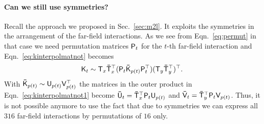 \paragraph{Can we still use symmetries?} Recall the approach we proposed in
Sec.~\ref{sec:m2l}. It exploits the symmetries in the arrangement of the
far-field interactions. As we see from Eqn.~\eqref{eq:permut} in that case we
need permutation matrices $\mathsf{P}_t$ for the $t$-th far-field interaction and
Eqn.~\eqref{eq:kinterpolmatnot} becomes
\begin{equation}
  \label{eq:symsplit}
  \mathsf{K}_t \sim \mathsf{T}_x \mathsf{\bar T}_x^\top (\mathsf{P}_t \mathsf{\bar K}_{p(t)}
  \mathsf{P}_t^\top) (\mathsf{T}_y \mathsf{\bar T}_y^\top)^\top.
\end{equation}
With $\mathsf{\bar K}_{p(t)} \sim \mathsf{U}_{p(t)} \mathsf{V}_{p(t)}^\top$ the
matrices in the outer product in Eqn.~\eqref{eq:kinterpolmatnot1} become
$\mathsf{\bar U}_t = \mathsf{\bar T}_x^\top \mathsf{P}_t \mathsf{U}_{p(t)}$ and $\mathsf{\bar
  V}_t = \mathsf{\bar T}_y^\top \mathsf{P}_t \mathsf{V}_{p(t)}$. Thus, it is not
possible anymore to use the fact that due to symmetries we can express all
$316$ far-field interactions by permutations of $16$ only.





